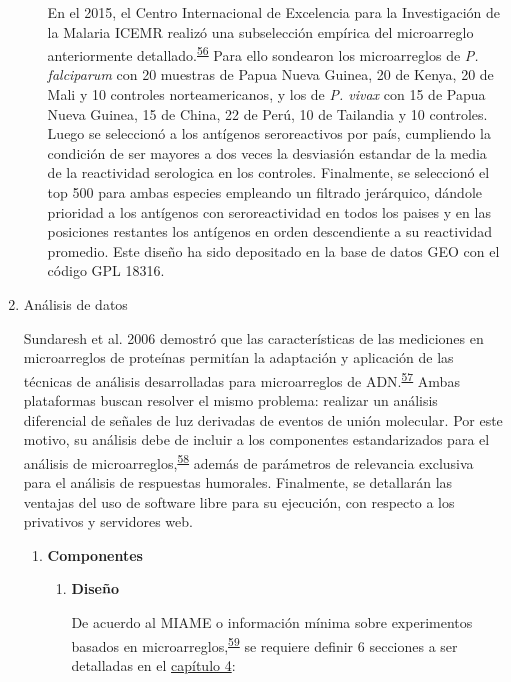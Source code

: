 \documentclass[]{article}
\begin{document}
\begin{enumerate}
\begin{enumerate}
    En el 2015, el Centro Internacional de Excelencia para la
    Investigación de la Malaria ICEMR realizó una subselección empírica
    del microarreglo anteriormente
    detallado.\textsuperscript{\protect\hyperlink{ref-King2015FOC}{56}}
    Para ello sondearon los microarreglos de \emph{P. falciparum} con 20
    muestras de Papua Nueva Guinea, 20 de Kenya, 20 de Mali y 10
    controles norteamericanos, y los de \emph{P. vivax} con 15 de Papua
    Nueva Guinea, 15 de China, 22 de Perú, 10 de Tailandia y 10
    controles. Luego se seleccionó a los antígenos seroreactivos por
    país, cumpliendo la condición de ser mayores a dos veces la
    desviasión estandar de la media de la reactividad serologica en los
    controles. Finalmente, se seleccionó el top 500 para ambas especies
    empleando un filtrado jerárquico, dándole prioridad a los antígenos
    con seroreactividad en todos los paises y en las posiciones
    restantes los antígenos en orden descendiente a su reactividad
    promedio. Este diseño ha sido depositado en la base de datos GEO con
    el código GPL 18316.
  \end{enumerate}
\item
  Análisis de datos

  Sundaresh et al. 2006 demostró que las características de las
  mediciones en microarreglos de proteínas permitían la adaptación y
  aplicación de las técnicas de análisis desarrolladas para
  microarreglos de
  ADN.\textsuperscript{\protect\hyperlink{ref-sundaresh2006}{57}} Ambas
  plataformas buscan resolver el mismo problema: realizar un análisis
  diferencial de señales de luz derivadas de eventos de unión molecular.
  Por este motivo, su análisis debe de incluir a los componentes
  estandarizados para el análisis de
  microarreglos,\textsuperscript{\protect\hyperlink{ref-allison2006}{58}}
  además de parámetros de relevancia exclusiva para el análisis de
  respuestas humorales. Finalmente, se detallarán las ventajas del uso
  de software libre para su ejecución, con respecto a los privativos y
  servidores web.

  \begin{enumerate}
  \def\labelenumii{\roman{enumii}.}
  \item
    \textbf{Componentes}

    \begin{enumerate}
    \def\labelenumiii{\arabic{enumiii}.}
    \item
      \textbf{Diseño}

      De acuerdo al MIAME o información mínima sobre experimentos
      basados en
      microarreglos,\textsuperscript{\protect\hyperlink{ref-brazma2001}{59}}
      se requiere definir 6 secciones a ser detalladas en el
      \protect\hyperlink{meto}{capítulo 4}:


\end{enumerate}
\end{enumerate}
\end{enumerate}
\end{document}
